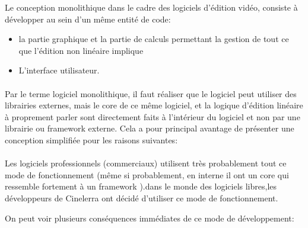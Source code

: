 Le conception monolithique  dans le cadre des
logiciels d'édition vidéo, consiste à développer au sein d'un même
entité de code:

\begin{itemize} \setlength{\itemsep}{2mm}

  \item {la partie graphique et la partie de calculs
    permettant la gestion de tout ce que l'édition non linéaire
    implique}

  \item {L'interface utilisateur.}

\end {itemize}

\paragraph{}

Par le terme logiciel monolithique, il faut réaliser
que le logiciel peut utiliser des librairies externes, mais le core de
ce même logiciel, et la logique d'édition linéaire à proprement
parler sont directement faits à l'intérieur du logiciel et non par
une librairie ou framework  externe. Cela a pour
principal avantage de présenter une conception simplifiée pour les
raisons suivantes:

\paragraph{}

Les logiciels professionnels (commerciaux) utilisent très probablement
tout ce mode de fonctionnement (même si probablement, en interne il ont
un core qui ressemble fortement à un framework ).dans
le monde des logiciels libres,les développeurs de Cinelerra ont décidé
d'utiliser ce mode de fonctionnement.

On peut voir plusieurs conséquences immédiates de ce mode de
développement:

